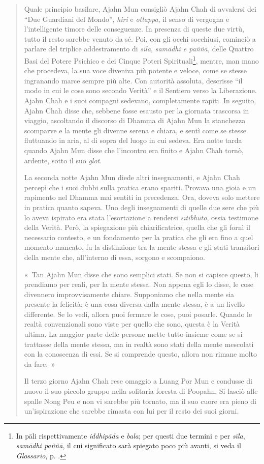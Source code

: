 \begin{quote}
Quale principio basilare, Ajahn Mun consigliò Ajahn Chah di avvalersi
dei ``Due Guardiani del Mondo'', \emph{hiri} e \emph{ottappa}, il senso
di vergogna e l'intelligente timore delle conseguenze. In presenza di
queste due virtù, tutto il resto sarebbe venuto da sé. Poi, con gli
occhi socchiusi, cominciò a parlare del triplice addestramento di
\emph{sīla}, \emph{samādhi e paññā,} delle Quattro Basi del Potere
Psichico e dei Cinque Poteri Spirituali\footnote{In pāli rispettivamente
  \emph{iddhipāda} e \emph{bala}; per questi due termini e per
  \emph{sīla}, \emph{samādhi paññā}, il cui significato sarà spiegato
  poco più avanti, si veda il \emph{Glossario}, p. \pageref{glossary-iddhipada}.}, mentre, man mano che
procedeva, la sua voce diveniva più potente e veloce, come se stesse
ingranando marce sempre più alte. Con autorità assoluta, descrisse ``il
modo in cui le cose sono secondo Verità'' e il Sentiero verso la
Liberazione. Ajahn Chah e i suoi compagni sedevano, completamente
rapiti. In seguito, Ajahn Chah disse che, sebbene fosse esausto per la
giornata trascorsa in viaggio, ascoltando il discorso di Dhamma di Ajahn
Mun la stanchezza scomparve e la mente gli divenne serena e chiara, e
sentì come se stesse fluttuando in aria, al di sopra del luogo in cui
sedeva. Era notte tarda quando Ajahn Mun disse che l'incontro era finito
e Ajahn Chah tornò, ardente, sotto il suo \emph{glot}.

La seconda notte Ajahn Mun diede altri insegnamenti, e Ajahn Chah
percepì che i suoi dubbi sulla pratica erano spariti. Provava una gioia
e un rapimento nel Dhamma mai sentiti in precedenza. Ora, doveva solo
mettere in pratica quanto sapeva. Uno degli insegnamenti di quelle due
sere che più lo aveva ispirato era stata l'esortazione a rendersi
\emph{sītibhūto}, ossia testimone della Verità. Però, la spiegazione più
chiarificatrice, quella che gli fornì il necessario contesto, e un
fondamento per la pratica che gli era fino a quel momento mancato, fu la
distinzione tra la mente stessa e gli stati transitori della mente che,
all'interno di essa, sorgono e scompaiono.

«~Tan Ajahn Mun disse che sono semplici stati. Se non si capisce questo,
li prendiamo per reali, per la mente stessa. Non appena egli lo disse,
le cose divennero improvvisamente chiare. Supponiamo che nella mente sia
presente la felicità; è una cosa diversa dalla mente stessa, è a un
livello differente. Se lo vedi, allora puoi fermare le cose, puoi
posarle. Quando le realtà convenzionali sono viste per quello che sono,
questa è la Verità ultima. La maggior parte delle persone mette tutto
insieme come se si trattasse della mente stessa, ma in realtà sono stati
della mente mescolati con la conoscenza di essi. Se si comprende questo,
allora non rimane molto da fare.~»

Il terzo giorno Ajahn Chah rese omaggio a Luang Por Mun e condusse di
nuovo il suo piccolo gruppo nella solitaria foresta di Poopahn. Si
lasciò alle spalle Nong Peu e non vi sarebbe più tornato, ma il suo
cuore era pieno di un'ispirazione che sarebbe rimasta con lui per il
resto dei suoi giorni.
\end{quote}

